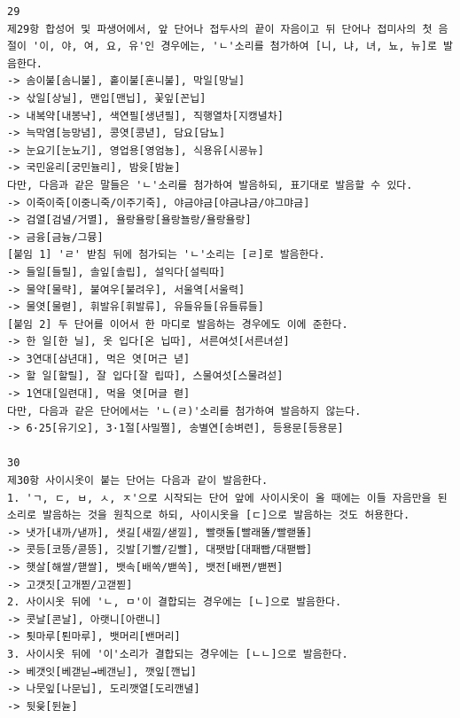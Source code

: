 \documentclass[letterpaper]{article} %
\begin{document}
\begin{verbatim}
29
제29항 합성어 및 파생어에서, 앞 단어나 접두사의 끝이 자음이고 뒤 단어나 접미사의 첫 음절이 '이, 야, 여, 요, 유'인 경우에는, 'ㄴ'소리를 첨가하여 [니, 냐, 녀, 뇨, 뉴]로 발음한다.
-> 솜이불[솜니불], 홑이불[혼니불], 막일[망닐]
-> 삯일[상닐], 맨입[맨닙], 꽃잎[꼰닙]
-> 내복약[내봉냑], 색연필[생년필], 직행열차[지캥녈차]
-> 늑막염[능망념], 콩엿[콩녇], 담요[담뇨]
-> 눈요기[눈뇨기], 영업용[영엄뇽], 식용유[시굥뉴]
-> 국민윤리[궁민뉼리], 밤윳[밤뉻]
다만, 다음과 같은 말들은 'ㄴ'소리를 첨가하여 발음하되, 표기대로 발음할 수 있다.
-> 이죽이죽[이중니죽/이주기죽], 야금야금[야금냐금/야그먀금]
-> 검열[검녈/거멸], 욜랑욜랑[욜랑뇰랑/욜랑욜랑]
-> 금융[금늉/그뮹]
[붙임 1] 'ㄹ' 받침 뒤에 첨가되는 'ㄴ'소리는 [ㄹ]로 발음한다.
-> 들일[들릴], 솔잎[솔립], 설익다[설릭따]
-> 물약[물략], 불여우[불려우], 서울역[서울력]
-> 물엿[물렫], 휘발유[휘발류], 유들유들[유들류들]
[붙임 2] 두 단어를 이어서 한 마디로 발음하는 경우에도 이에 준한다.
-> 한 일[한 닐], 옷 입다[온 닙따], 서른여섯[서른녀섣]
-> 3연대[삼년대], 먹은 엿[머근 녇]
-> 할 일[할릴], 잘 입다[잘 립따], 스물여섯[스물려섣]
-> 1연대[일련대], 먹을 엿[머글 렫]
다만, 다음과 같은 단어에서는 'ㄴ(ㄹ)'소리를 첨가하여 발음하지 않는다.
-> 6·25[유기오], 3·1절[사밀쩔], 송별연[송벼련], 등용문[등용문]

30
제30항 사이시옷이 붙는 단어는 다음과 같이 발음한다.
1. 'ㄱ, ㄷ, ㅂ, ㅅ, ㅈ'으로 시작되는 단어 앞에 사이시옷이 올 때에는 이들 자음만을 된소리로 발음하는 것을 원칙으로 하되, 사이시옷을 [ㄷ]으로 발음하는 것도 허용한다.
-> 냇가[내까/낻까], 샛길[새낄/샏낄], 빨랫돌[빨래똘/빨랟똘]
-> 콧등[코뜽/콛뜽], 깃발[기빨/긷빨], 대팻밥[대패빱/대팯빱]
-> 햇살[해쌀/핻쌀], 뱃속[배쏙/밷쏙], 뱃전[배쩐/밷쩐]
-> 고갯짓[고개찓/고갣찓]
2. 사이시옷 뒤에 'ㄴ, ㅁ'이 결합되는 경우에는 [ㄴ]으로 발음한다.
-> 콧날[콘날], 아랫니[아랜니]
-> 툇마루[퇸마루], 뱃머리[밴머리]
3. 사이시옷 뒤에 '이'소리가 결합되는 경우에는 [ㄴㄴ]으로 발음한다.
-> 베갯잇[베갣닏→베갠닏], 깻잎[깬닙]
-> 나뭇잎[나문닙], 도리깻열[도리깬녈]
-> 뒷윷[뒨뉻]

\end{verbatim}


\bigskip

\end{document}
